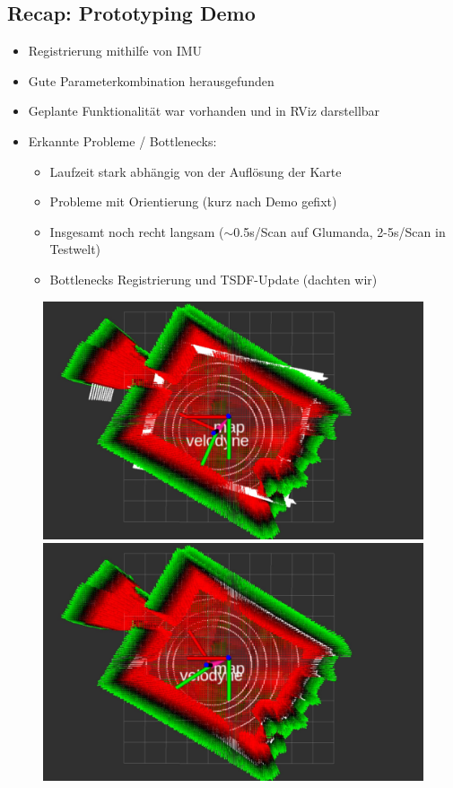 \documentclass{beamer}
\begin{document}
\subsection{Recap: Prototyping Demo}
\begin{frame}{\subsecname}
\begin{itemize}
    \item Registrierung mithilfe von IMU
    \item Gute Parameterkombination herausgefunden
    \item Geplante Funktionalität war vorhanden und in RViz darstellbar
    \item Erkannte Probleme / Bottlenecks:
    \begin{itemize}
        \item Laufzeit stark abhängig von der Auflösung der Karte
        \item Probleme mit Orientierung (kurz nach Demo gefixt)
        \item Insgesamt noch recht langsam ($\sim$0.5s/Scan auf Glumanda, 2-5s/Scan in Testwelt)
        \item Bottlenecks Registrierung und TSDF-Update (dachten wir)
    \end{itemize}
\end{itemize}
\begin{figure}
    \includegraphics[width=\linewidth]{images/demo1.jpg}
\endminipage\hfill
{}
    \includegraphics[width=\linewidth]{images/demo2.jpg}
\endminipage\hfill
\end{figure}
\end{frame}
\end{document}
